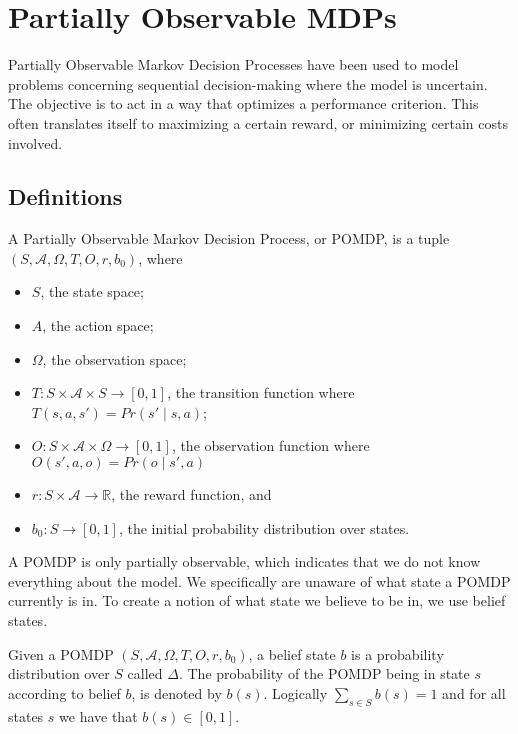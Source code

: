 \section{Partially Observable MDPs}
Partially Observable Markov Decision Processes have been used to model problems
concerning sequential decision-making where the model is uncertain. The objective is
to act in a way that optimizes a performance criterion. This often translates itself to
maximizing a certain reward, or minimizing certain costs involved.

\subsection{Definitions}

\begin{definition}
	A Partially Observable Markov Decision Process, or POMDP, is a tuple $(S, \mathcal{A}, \Omega, T, O, r, b_0)$, where
	\begin{itemize}
		\item $S$, the state space;
		\item $A$, the action space;
		\item $\Omega$, the observation space;
		\item $T:S\times \mathcal{A} \times S \to [0,1]$, the transition function where
			$T(s,a,s')=Pr(s'\mid s,a)$;
		\item $O:S\times \mathcal{A} \times \Omega \to [0,1]$, the observation function where
		$O(s',a,o)= Pr(o\mid s',a)$
		\item $r: S \times \mathcal{A} \to \mathds{R}$, the reward function, and 
		\item $b_0 : S \to [0,1]$, the initial probability distribution over states.
	\end{itemize}
\end{definition}

A POMDP is only partially observable, which indicates that we do not know everything about the model. We specifically are unaware of what state a POMDP currently is in. To create a notion of what state we believe to be in, we use belief states.

\begin{definition}
	Given a POMDP $(S, \mathcal{A}, \Omega, T, O, r, b_0)$, a belief state $b$ is a probability distribution over $S$ called $\Delta$. The probability of the POMDP being in state $s$ according to belief $b$, is denoted by $b(s)$. Logically $\sum_{s\in S}b(s)=1$ and for all states $s$ we have that $b(s)\in[0,1]$.
\end{definition}

